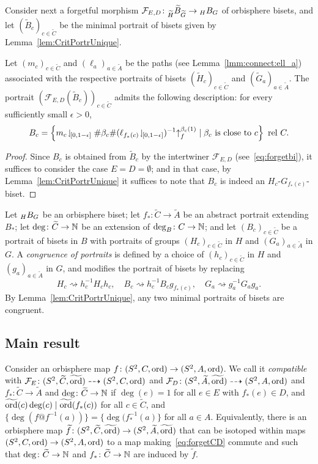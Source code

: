 \documentclass{amsart}
\newcommand\Forget{{\mathcal F}}
\newcommand\wtf{{\widetilde f}}
\newcommand\wtA{{\widetilde A}}
\newcommand\wtB{{\widetilde B}}
\newcommand\wtC{{\widetilde C}}
\newcommand\wtG{{\widetilde G}}
\newcommand\wtH{{\widetilde H}}
\newcommand\wtord{{\widetilde\ord}}
\begin{document}
Consider next a forgetful morphism
$\Forget_{E,D}\colon\subscript{\wtH}{\wtB}_{\wtG} \to\subscript H B_G$ of orbisphere bisets, and let
$(\wtB_c)_{c\in\wtC}$ be the minimal portrait of
bisets given by Lemma~\ref{lem:CritPortrUnique}.
\begin{lem}
\label{lmm:connect:ell_a:2}
  Let $(m_c)_{c\in\wtC}$ and $(\ell_a)_{a\in\wtA}$ be
  the paths (see Lemma~\ref{lmm:connect:ell_a}) associated with the respective portraits of bisets
  $(\wtH_c)_{c\in\wtC}$ and
  $(\wtG_a)_{a\in\wtA}$.  The portrait
  $(\Forget_{E,D}(\wtB_c))_{c\in\wtC}$ admits the
  following description: for every sufficiently small $\epsilon>0$,
  \begin{equation}\label{eq:lmm:connect:ell_a2}
    B_c = \left\{m_c\!\downharpoonleft_{\![0,1-\epsilon]}\#\beta_c \#(\ell_{f_*(c)}\!\downharpoonleft_{\![0,1-\epsilon]})^{-1} {\uparrow}_{f}^{\beta_c(1)}\mid\beta_c \text{ is close to }c\right\}\text{ rel } C.
  \end{equation}
\end{lem}
\begin{proof}
  Since $B_c$ is obtained from $\wtB_c$ by the intertwiner
  $\Forget_{E,D}$ (see~\eqref{eq:forgetbi}), it suffices to consider
  the case $E=D=\emptyset$; and in that case, by
  Lemma~\ref{lem:CritPortrUnique} it suffices to note that $B_c$ is
  indeed an $H_c$-$G_{f_*(c)}$-biset.
\end{proof}

Let $\subscript H B_G$ be an orbisphere biset; let
$f_*\colon \wtC\to\wtA$ be an abstract portrait extending $B_*$; let
$\deg\colon \wtC\to\N$ be an extension of $\deg_B\colon C\to{\mathbb N}$; and
let $(B_c)_{c\in \wtC}$ be a portrait of bisets in $B$ with portraits
of groups $(H_c)_{c\in \wtC}$ in $H$ and $(G_a)_{a\in \wtA}$ in $G$.
A \emph{congruence of portraits} is defined by a choice of
$(h_c)_{c\in \wtC}$ in $H$ and $(g_a)_{a\in \wtA}$ in $G$, and
modifies the portrait of bisets by replacing
\[H_c\rightsquigarrow h_c^{-1} H_c h_c,\quad B_c\rightsquigarrow
  h_c^{-1} B_c g_{f_*(c)},\quad G_a\rightsquigarrow g_a^{-1} G_a g_a.
\]
By Lemma~\ref{lem:CritPortrUnique}, any two minimal portraits of
bisets are congruent.

\subsection{Main result}
Consider an orbisphere map $f\colon (S^2,C,\operatorname{ord})\to (S^2,A,\operatorname{ord})$. We
call it \emph{compatible} with
$\Forget_E\colon (S^2,\wtC,\wtord)\dashrightarrow (S^2,C,\ord)$ and
$\Forget_D\colon (S^2,\wtA,\wtord)\dashrightarrow (S^2,A,\ord)$ and
$f_*\colon \wtC\to\wtA$ and $\deg\colon \wtC\to\N$ if $\deg(e)=1$ for
all $e\in E$ with $f_*(e)\in D$, and
$\wtord(c)\deg(c)\mid \wtord(f_*(c))$ for all $c\in \wtC$, and
$\{\deg(f@f^{-1}(a))\}=\{\deg(f_*^{-1}(a)\}$ for all $a\in A$.
Equivalently, there is an orbisphere map
$\wtf\colon(S^2,\wtC,\wtord)\to(S^2,\wtA,\wtord)$ that can be isotoped
within maps $(S^2,C,\operatorname{ord})\to(S^2,A,\operatorname{ord})$ to a map
making~\eqref{eq:forgetCD} commute and such that
$\deg\colon \wtC\to \N$ and $f_*\colon \wtC\to \N$ are induced by
$\wtf$.
\end{document}
